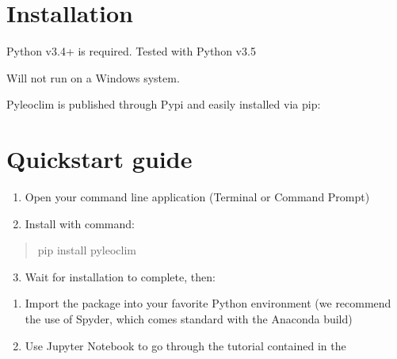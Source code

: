 \documentclass[letterpaper,10pt,english]{sphinxmanual}
\begin{document}
\section{Installation}
\label{\detokenize{Introduction:installation}}
Python v3.4+ is required. Tested with Python v3.5

Will not run on a Windows system.

Pyleoclim is published through Pypi and easily installed via pip:

%
\begin{sphinxVerbatim}[commandchars=\\\{\}]
  
\end{sphinxVerbatim}


\section{Quickstart guide}
\label{\detokenize{Introduction:quickstart-guide}}\begin{enumerate}
\item {} 
Open your command line application (Terminal or Command Prompt)

\item {} 
Install with command:

\end{enumerate}
\begin{quote}

pip install pyleoclim
\end{quote}
\begin{enumerate}
\setcounter{enumi}{2}
\item {} 
Wait for installation to complete, then:

\end{enumerate}
\begin{enumerate}
\item {} 
Import the package into your favorite Python environment (we recommend the use of Spyder, which comes standard with the Anaconda build)

\item {} 
Use Jupyter Notebook to go through the tutorial contained in the 

\end{enumerate}
\end{document}
